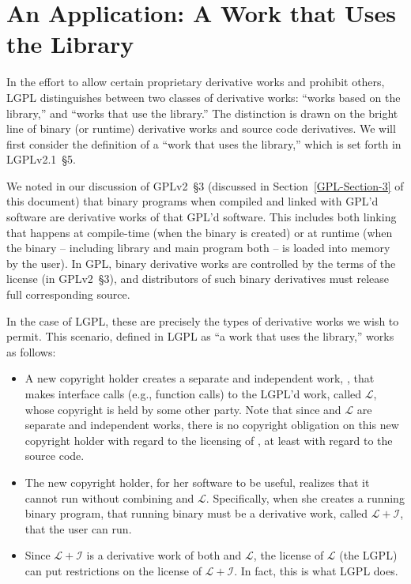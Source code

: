 \section{An Application: A Work that Uses the Library}

In the effort to allow certain proprietary derivative works and prohibit
others, LGPL distinguishes between two classes of derivative works:
``works based on the library,'' and ``works that use the library.''  The
distinction is drawn on the bright line of binary (or runtime) derivative
works and source code derivatives. We will first consider the definition
of a ``work that uses the library,'' which is set forth in LGPLv2.1~\S5.

We noted in our discussion of GPLv2~\S3 (discussed in
Section~\ref{GPL-Section-3} of this document) that binary programs when
compiled and linked with GPL'd software are derivative works of that GPL'd
software. This includes both linking that happens at compile-time (when
the binary is created) or at runtime (when the binary -- including library
and main program both -- is loaded into memory by the user). In GPL,
binary derivative works are controlled by the terms of the license (in GPLv2~\S3),
and distributors of such binary derivatives must release full
corresponding source\@.

In the case of LGPL, these are precisely the types of derivative works
we wish to permit. This scenario, defined in LGPL as ``a work that uses
the library,'' works as follows:

\newcommand{\workl}{$\mathcal{L}$}
\newcommand{\lplusi}{$\mathcal{L\!\!+\!\!I}$}

\begin{itemize}

\item A new copyright holder creates a separate and independent work,
  \worki{}, that makes interface calls (e.g., function calls) to the
  LGPL'd work, called \workl{}, whose copyright is held by some other
  party. Note that since \worki{} and \workl{} are separate and
  independent works, there is no copyright obligation on this new copyright
  holder with regard to the licensing of \worki{}, at least with regard to
  the source code.

\item The new copyright holder, for her software to be useful, realizes
  that it cannot run without combining \worki{} and \workl{}.
  Specifically, when she creates a running binary program, that running
  binary must be a derivative work, called \lplusi{}, that the user can
  run.

\item Since \lplusi{} is a derivative work of both \worki{} and \workl{},
  the license of \workl{} (the LGPL) can put restrictions on the license
  of \lplusi{}. In fact, this is what LGPL does.

\end{itemize}

